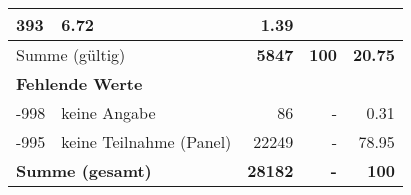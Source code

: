 \begin{longtable}{lXrrr}
       \num{393} &
       \num[round-mode=places,round-precision=2]{6,72} &
         \num[round-mode=places,round-precision=2]{1,39} \\
     \midrule
     \multicolumn{2}{l}{Summe (gültig)} &
       \textbf{\num{5847}} &
     \textbf{100} &
       \textbf{\num[round-mode=places,round-precision=2]{20,75}} \\
     \multicolumn{5}{l}{\textbf{Fehlende Werte}}\\
       -998 &
       keine Angabe &
         \num{86} &
        - &
         \num[round-mode=places,round-precision=2]{0,31} \\
       -995 &
       keine Teilnahme (Panel) &
         \num{22249} &
        - &
         \num[round-mode=places,round-precision=2]{78,95} \\
     \midrule
     \multicolumn{2}{l}{\textbf{Summe (gesamt)}} &
          \textbf{\num{28182}} &
        \textbf{-} &
        \textbf{100} \\
     \bottomrule
     \end{longtable}
     
